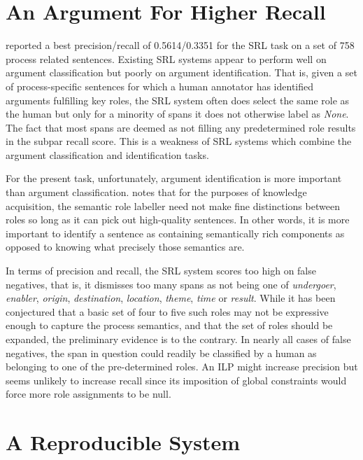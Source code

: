 \documentclass{article} %
\begin{document}
\section{An Argument For Higher Recall}
\cite{sl} reported a best precision/recall of 0.5614/0.3351 for the SRL task on a set of 758 process related sentences.  Existing SRL systems appear to perform well on argument classification but poorly on argument identification.  That is, given a set of process-specific sentences for which a human annotator has identified arguments fulfilling key roles, the SRL system often does select the same role as the human but only for a minority of spans it does not otherwise label as {\it None}.  The fact that most spans are deemed as not filling any predetermined role results in the subpar recall score.  This is a weakness of SRL systems which combine the argument classification and identification tasks.

For the present task, unfortunately, argument identification is more important than argument classification.  \cite{bala} notes that for the purposes of knowledge acquisition, the semantic role labeller need not make fine distinctions between roles so long as it can pick out high-quality sentences.  In other words, it is more important to identify a sentence as containing semantically rich components as opposed to knowing what precisely those semantics are.

In terms of precision and recall, the SRL system scores too high on false negatives, that is, it dismisses too many spans as not being one of {\it undergoer}, {\it enabler}, {\it origin}, {\it destination}, {\it location}, {\it theme}, {\it time} or {\it result}.  While it has been conjectured that a basic set of four to five such roles may not be expressive enough to capture the process semantics, and that the set of roles should be expanded, the preliminary evidence is to the contrary.  In nearly all cases of false negatives, the span in question could readily be classified by a human as belonging to one of the pre-determined roles.  An ILP might increase precision but seems unlikely to increase recall since its imposition of global constraints would force more role assignments to be null.  

\section{A Reproducible System}
\end{document}
